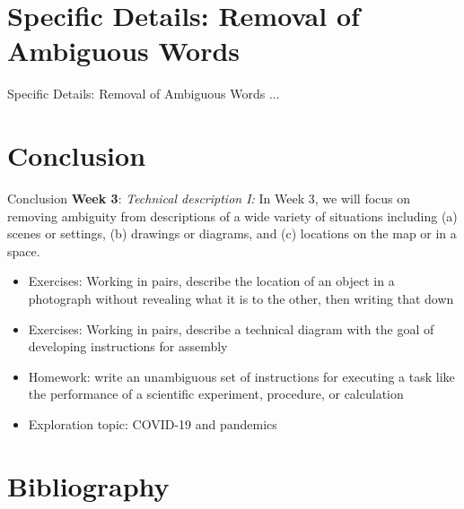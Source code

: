 \documentclass{beamer}
\begin{document}
\section{Specific Details: Removal of Ambiguous Words}

\begin{frame}{Specific Details: Removal of Ambiguous Words}
...
\end{frame}

\section{Conclusion}

\begin{frame}{Conclusion}
\textbf{Week 3}: \textit{Technical description I:} In Week 3, we will focus on removing ambiguity from descriptions of a wide variety of situations including (a) scenes or settings, (b) drawings or diagrams, and (c) locations on the map or in a space.
\begin{itemize}
\item Exercises: Working in pairs, describe the location of an object in a photograph without revealing what it is to the other, then writing that down
\item Exercises: Working in pairs, describe a technical diagram with the goal of developing instructions for assembly
\item Homework: write an unambiguous set of instructions for executing a task like the performance of a scientific experiment, procedure, or calculation
\item Exploration topic: COVID-19 and pandemics
\end{itemize}
\end{frame}


\section{Bibliography}


\end{document}
